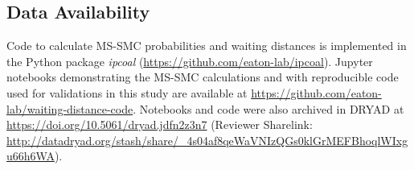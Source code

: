 \documentclass[11pt]{article}
\begin{document}
\subsection{Data Availability}
Code to calculate MS-SMC probabilities and waiting distances is 
implemented in the Python package \emph{ipcoal} 
(\url{https://github.com/eaton-lab/ipcoal}). 
Jupyter notebooks demonstrating the MS-SMC calculations and with 
reproducible code used for validations in this study are available
at \url{https://github.com/eaton-lab/waiting-distance-code}. Notebooks
and code were also archived in DRYAD at
\url{https://doi.org/10.5061/dryad.jdfn2z3n7} (Reviewer Sharelink: 
\url{http://datadryad.org/stash/share/_4s04af8qeWaVNIzQGs0klGrMEFBhoqlWIxgu66h6WA}).



  










\end{document}
